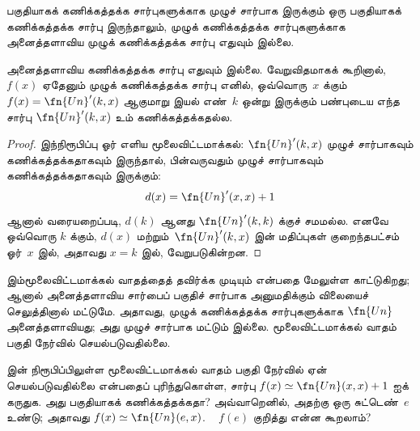 \documentclass[../../../include/open-logic-section]{subfiles}
\begin{document}


பகுதியாகக் கணிக்கத்தக்க சார்புகளுக்காக முழுச் சார்பாக இருக்கும் ஒரு
பகுதியாகக் கணிக்கத்தக்க சார்பு இருந்தாலும், முழுக் கணிக்கத்தக்க
சார்புகளுக்காக அனைத்தளாவிய முழுக் கணிக்கத்தக்க சார்பு எதுவும் இல்லை.

\begin{thm}
அனைத்தளாவிய கணிக்கத்தக்க சார்பு எதுவும் இல்லை. வேறுவிதமாகக் கூறினால்,
$f(x)$ ஏதேனும் முழுக் கணிக்கத்தக்க சார்பு எனில், ஒவ்வொரு~$x$ க்கும்
$f(x) = \fn{Un}'(k,x)$ ஆகுமாறு இயல் எண்~$k$ ஒன்று இருக்கும்
பண்புடைய எந்த சார்பு $\fn{Un}'(k, x)$ உம் கணிக்கத்தக்கதல்ல.
\end{thm}

\begin{proof}
இந்நிரூபிப்பு ஓர் எளிய மூலைவிட்டமாக்கல்:
$\fn{Un}'(k,x)$ முழுச் சார்பாகவும் கணிக்கத்தக்கதாகவும் இருந்தால்,
பின்வருவதும் முழுச் சார்பாகவும் கணிக்கத்தக்கதாகவும் இருக்கும்:
\[
d(x) = \fn{Un}'(x, x) + 1
\]
ஆனால் வரையறைப்படி, $d(k)$ ஆனது $\fn{Un}'(k,k)$ க்குச் சமமல்ல.
எனவே ஒவ்வொரு $k$ க்கும், $d(x)$ மற்றும்~$\fn{Un}'(k, x)$ இன்
மதிப்புகள் குறைந்தபட்சம் ஓர்~$x$ இல், அதாவது $x = k$ இல்,
வேறுபடுகின்றன.
\end{proof}

\begin{explain}
இம்மூலைவிட்டமாக்கல் வாதத்தைத் தவிர்க்க முடியும் என்பதை மேலுள்ள
 காட்டுகிறது; ஆனால் அனைத்தளாவிய சார்பைப்
பகுதிச் சார்பாக அனுமதிக்கும் விலையைச் செலுத்தினால் மட்டுமே.
அதாவது, முழுக் கணிக்கத்தக்க சார்புகளுக்காக $\fn{Un}$
அனைத்தளாவியது; அது முழுச் சார்பாக மட்டும் இல்லை.
மூலைவிட்டமாக்கல் வாதம் பகுதி நேர்வில் செயல்படுவதில்லை.
\end{explain}

\begin{prob}
   இன் நிரூபிப்பிலுள்ள மூலைவிட்டமாக்கல் வாதம்
  பகுதி நேர்வில் ஏன் செயல்படுவதில்லை என்பதைப் புரிந்துகொள்ள,
  சார்பு $f(x) \simeq \fn{Un}(x,x)+1$ ஐக் கருதுக. அது பகுதியாகக்
  கணிக்கத்தக்கதா? அவ்வாறெனில், அதற்கு ஒரு சுட்டெண்~$e$ உண்டு;
  அதாவது $f(x) \simeq \fn{Un}(e,x)$. ~ $f(e)$ குறித்து என்ன
  கூறலாம்?
\end{prob}
\end{document}
